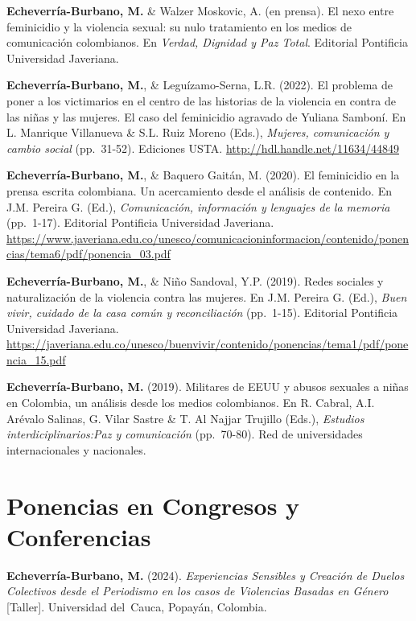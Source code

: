 \documentclass[11pt,a4paper,]{awesome-cv}
\begin{document}
\textbf{Echeverría-Burbano, M.} \& Walzer Moskovic, A. (en prensa). El
nexo entre feminicidio y la violencia sexual: su nulo tratamiento en los
medios de comunicación colombianos. En \emph{Verdad, Dignidad y Paz
Total}. Editorial Pontificia Universidad Javeriana.

\textbf{Echeverría-Burbano, M.}, \& Leguízamo-Serna, L.R. (2022). El
problema de poner a los victimarios en el centro de las historias de la
violencia en contra de las niñas y las mujeres. El caso del feminicidio
agravado de Yuliana Samboní. En L. Manrique Villanueva \& S.L. Ruiz
Moreno (Eds.), \emph{Mujeres, comunicación y cambio social} (pp.~31-52).
Ediciones USTA. \url{http://hdl.handle.net/11634/44849}

\textbf{Echeverría-Burbano, M.}, \& Baquero Gaitán, M. (2020). El
feminicidio en la prensa escrita colombiana. Un acercamiento desde el
análisis de contenido. En J.M. Pereira G. (Ed.), \emph{Comunicación,
información y lenguajes de la memoria} (pp.~1-17). Editorial Pontificia
Universidad Javeriana.
\url{https://www.javeriana.edu.co/unesco/comunicacioninformacion/contenido/ponencias/tema6/pdf/ponencia_03.pdf}

\textbf{Echeverría-Burbano, M.}, \& Niño Sandoval, Y.P. (2019). Redes
sociales y naturalización de la violencia contra las mujeres. En J.M.
Pereira G. (Ed.), \emph{Buen vivir, cuidado de la casa común y
reconciliación} (pp.~1-15). Editorial Pontificia Universidad Javeriana.
\url{https://javeriana.edu.co/unesco/buenvivir/contenido/ponencias/tema1/pdf/ponencia_15.pdf}

\textbf{Echeverría-Burbano, M.} (2019). Militares de EEUU y abusos
sexuales a niñas en Colombia, un análisis desde los medios colombianos.
En R. Cabral, A.I. Arévalo Salinas, G. Vilar Sastre \& T. Al Najjar
Trujillo (Eds.), \emph{Estudios interdiciplinarios:Paz y comunicación}
(pp.~70-80). Red de universidades internacionales y nacionales.

\endgroup

\hypertarget{ponencias-en-congresos-y-conferencias}{%
\section{Ponencias en Congresos y
Conferencias}\label{ponencias-en-congresos-y-conferencias}}

\begingroup
\setlength{\parindent}{-0.5in}
\setlength{\leftskip}{0.5in}

\textbf{Echeverría-Burbano, M.} (2024). \emph{Experiencias Sensibles y
Creación de Duelos Colectivos desde el Periodismo en los casos de
Violencias Basadas en Género} {[}Taller{]}. Universidad del~Cauca,
Popayán, Colombia.
\end{document}
